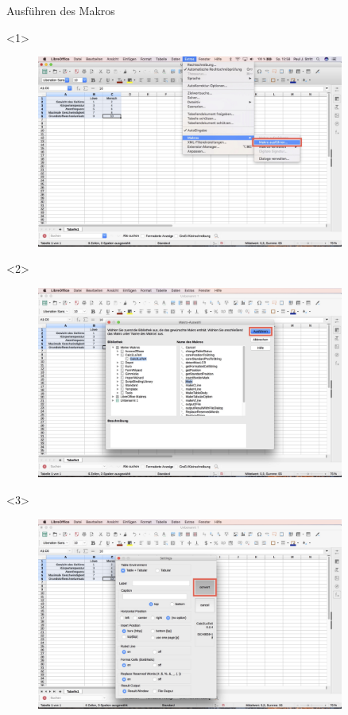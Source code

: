 \begin{frame}[c]{Ausführen des Makros}
	\begin{onlyenv}
		\begin{figure}[htbp]
			\centering
			\includegraphics[width=0.9\textwidth]{img/Bildschirmfoto_mitKasten/4_Ausfuhren_Macro/1.jpg}
		\end{figure}
	\end{onlyenv}
	\begin{onlyenv}
		\begin{figure}[htbp]
			\centering
			\includegraphics[width=0.9\textwidth]{img/Bildschirmfoto_mitKasten/4_Ausfuhren_Macro/2.jpg}
		\end{figure}
	\end{onlyenv}
	\begin{onlyenv}
		\begin{figure}[htbp]
			\centering
			\includegraphics[width=0.9\textwidth]{img/Bildschirmfoto_mitKasten/3_Tabelle/6.jpg}

\end{figure}
\end{onlyenv}
\end{frame}
